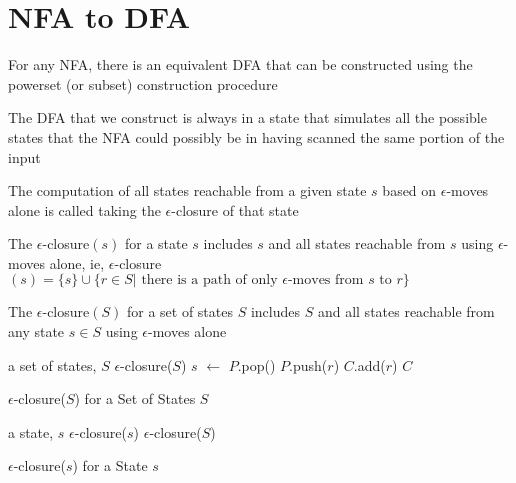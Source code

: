 \documentclass[8pt,a4paper,compress]{beamer}
\begin{document}
\section{NFA to DFA}
\begin{frame}[fragile]
\pause

For any NFA, there is an equivalent DFA that can be constructed using the powerset (or subset) construction procedure

\pause
\bigskip

The DFA that we construct is always in a state that simulates all the possible states that the NFA could possibly be in having scanned the same portion of the input

\pause
\bigskip

The computation of all states reachable from a given state $s$ based on $\epsilon$-moves alone is called taking the $\epsilon$-closure of that state

\pause
\bigskip

The $\epsilon$-closure$(s)$ for a state $s$ includes $s$ and all states reachable from $s$ using $\epsilon$-moves alone, ie, $\epsilon$-closure$(s) = \{s\} \cup \{r \in S | \text{ there is a path of only } \epsilon\text{-moves from } s \text{ to } r\}$

\pause
\bigskip

The $\epsilon$-closure$(S)$ for a set of states $S$ includes $S$ and all states reachable from any state $s \in S$ using  $\epsilon$-moves alone
\end{frame}

\begin{frame}[fragile]
\pause

\begin{algorithm}[H]
\begin{algorithmic}
\REQUIRE a set of states, $S$
\ENSURE $\epsilon$-closure($S$)
   
     
\STATE $s$ $\gets$ $P$.pop()
\STATE{} 
\STATE $P$.push($r$)
\STATE $C$.add($r$)
\ENDIF
\ENDFOR
\ENDWHILE
\RETURN $C$
\end{algorithmic}
\caption{$\epsilon$-closure($S$) for a Set of States $S$}
\end{algorithm}

\pause
\bigskip

\begin{algorithm}[H]
\begin{algorithmic}
\REQUIRE a state, $s$
\ENSURE $\epsilon$-closure($s$)
  
\RETURN $\epsilon$-closure($S$)
\end{algorithmic}
\caption{$\epsilon$-closure($s$) for a State $s$}
\end{algorithm}
\end{frame}
\end{document}
